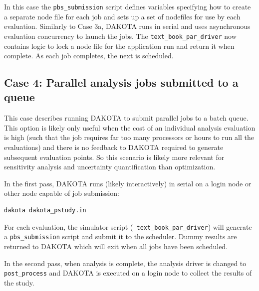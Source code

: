 In this case the {\tt pbs\_submission} script defines variables
specifying how to create a separate node file for each job and sets up
a set of nodefiles for use by each evaluation. Similarly to Case 3a,
DAKOTA runs in serial and uses asynchronous evaluation concurrency to
launch the jobs.  The {\tt text\_book\_par\_driver} now contains logic
to lock a node file for the application run and return it when
complete.  As each job completes, the next is scheduled.

\subsection{Case 4: Parallel analysis jobs submitted to a queue}

This case describes running DAKOTA to submit parallel jobs to a batch
queue.  This option is likely only useful when the cost of an
individual analysis evaluation is high (such that the job requires far
too many processors or hours to run all the evaluations) and there is
no feedback to DAKOTA required to generate subsequent evaluation
points.  So this scenario is likely more relevant for sensitivity
analysis and uncertainty quantification than optimization.

In the first pass, DAKOTA runs (likely interactively) in serial on a
login node or other node capable of job submission:
\begin{verbatim}
dakota dakota_pstudy.in
\end{verbatim}
For each evaluation, the simulator script ({\tt
text\_book\_par\_driver}) will generate a {\tt pbs\_submission} script
and submit it to the scheduler.  Dummy results are returned to DAKOTA
which will exit when all jobs have been scheduled.

In the second pass, when analysis is complete, the analysis driver is
changed to {\tt post\_process} and DAKOTA is executed on a login node
to collect the results of the study.
